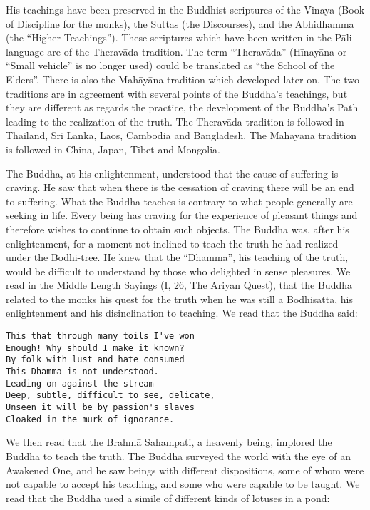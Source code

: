 \documentclass{book}
\begin{document}
His teachings have been preserved in the Buddhist scriptures of the
Vinaya (Book of Discipline for the monks), the Suttas (the Discourses),
and the Abhidhamma (the ``Higher Teachings''). These scriptures which
have been written in the Pāli language are of the Theravāda tradition.
The term ``Theravāda'' (Hīnayāna or ``Small vehicle'' is no longer used)
could be translated as ``the School of the Elders''. There is also the
Mahāyāna tradition which devel­oped later on. The two traditions are in
agreement with several points of the Buddha's teachings, but they are
different as regards the practice, the development of the Buddha's Path
leading to the realization of the truth. The Theravāda tradition is
followed in Thailand, Sri Lanka, Laos, Cambodia and Bangladesh. The
Mahāyāna tradition is followed in China, Japan, Tibet and Mongolia.

The Buddha, at his enlightenment, understood that the cause of suffering
is craving. He saw that when there is the cessation of craving there
will be an end to suffering. What the Buddha teaches is contrary to what
people generally are seeking in life. Every being has craving for the
experience of pleasant things and therefore wishes to continue to obtain
such objects. The Buddha was, after his enlightenment, for a moment not
inclined to teach the truth he had realized under the Bodhi-tree. He
knew that the ``Dhamma'', his teaching of the truth, would be difficult
to understand by those who delighted in sense pleasures. We read in the
Middle Length Sayings (I, 26, The Ariyan Quest), that the Buddha
related to the monks his quest for the truth when he was still a
Bodhisatta, his enlightenment and his disinclination to teaching. We
read that the Buddha said:

\begin{verbatim}
This that through many toils I've won
Enough! Why should I make it known?
By folk with lust and hate consumed
This Dhamma is not understood.
Leading on against the stream
Deep, subtle, difficult to see, delicate,
Unseen it will be by passion's slaves
Cloaked in the murk of ignorance.
\end{verbatim}

We then read that the Brahmā Sahampati, a heavenly being, implored the
Buddha to teach the truth. The Buddha surveyed the world with the eye of
an Awakened One, and he saw beings with different dispositions, some of
whom were not capable to accept his teaching, and some who were capable
to be taught. We read that the Buddha used a simile of different kinds
of lotuses in a pond:
\end{document}
